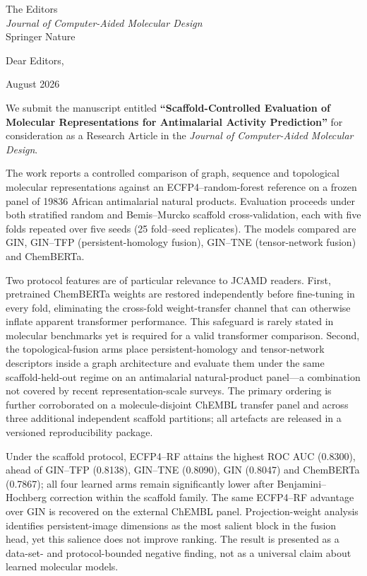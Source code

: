 \documentclass[11pt,a4paper]{letter}
\begin{document}
\begin{letter}{%
  The Editors \\
  \textit{Journal of Computer-Aided Molecular Design} \\
  Springer Nature
}

\opening{Dear Editors,}

 August 2026

We submit the manuscript entitled \textbf{``Scaffold-Controlled Evaluation of Molecular Representations for Antimalarial Activity Prediction''} for consideration as a Research Article in the \textit{Journal of Computer-Aided Molecular Design}.

The work reports a controlled comparison of graph, sequence and topological molecular representations against an ECFP4--random-forest reference on a frozen panel of \num{19836} African antimalarial natural products. Evaluation proceeds under both stratified random and Bemis--Murcko scaffold cross-validation, each with five folds repeated over five seeds (\num{25} fold--seed replicates). The models compared are GIN, GIN--TFP (persistent-homology fusion), GIN--TNE (tensor-network fusion) and ChemBERTa.

Two protocol features are of particular relevance to JCAMD readers. First, pretrained ChemBERTa weights are restored independently before fine-tuning in every fold, eliminating the cross-fold weight-transfer channel that can otherwise inflate apparent transformer performance. This safeguard is rarely stated in molecular benchmarks yet is required for a valid transformer comparison. Second, the topological-fusion arms place persistent-homology and tensor-network descriptors inside a graph architecture and evaluate them under the same scaffold-held-out regime on an antimalarial natural-product panel---a combination not covered by recent representation-scale surveys. The primary ordering is further corroborated on a molecule-disjoint ChEMBL transfer panel and across three additional independent scaffold partitions; all artefacts are released in a versioned reproducibility package.

Under the scaffold protocol, ECFP4--RF attains the highest ROC AUC (\num{0.8300}), ahead of GIN--TFP (\num{0.8138}), GIN--TNE (\num{0.8090}), GIN (\num{0.8047}) and ChemBERTa (\num{0.7867}); all four learned arms remain significantly lower after Benjamini--Hochberg correction within the scaffold family. The same ECFP4--RF advantage over GIN is recovered on the external ChEMBL panel. Projection-weight analysis identifies persistent-image dimensions as the most salient block in the fusion head, yet this salience does not improve ranking. The result is presented as a data-set- and protocol-bounded negative finding, not as a universal claim about learned molecular models.


\end{letter}
\end{document}
